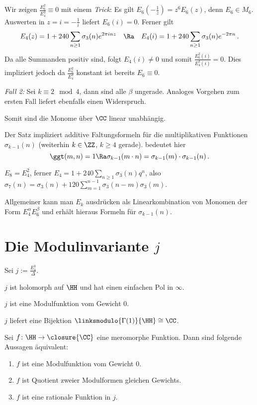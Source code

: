 \begin{bewe}
Wir zeigen $\frac{E_6^2}{E_4^3} \equiv 0$ mit einem \emph{Trick}: Es gilt $E_6 (- \frac 1z) = z^6 E_6(z)$, denn $E_6 \in M_6$. Auswerten in $z = i = - \frac 1i$ liefert $E_6 (i) = 0$. Ferner gilt
\[
E_4(z) = 1 + 240 \sum_{n \geq 1} \sigma_3 (n) e^{2\pi i n z} \quad \Ra \quad E_4 (i) = 1 + 240 \sum_{n \geq 1} \sigma_3 (n) e^{-2 \pi n}
\,.
\] 
Da alle Summanden positiv sind, folgt $E_4(i) \neq 0$ und somit $\frac{E_6^2(i)}{E_4^3(i)} = 0$. Dies impliziert jedoch da $\frac{E_6^2}{E_4^3}$ konstant ist bereits $E_6 \equiv 0$. \blitz

\emph{Fall 2:} Sei $k \equiv 2 \mod 4$, dann sind alle $\beta$ ungerade. Analoges Vorgehen zum ersten Fall liefert ebenfalls einen Widerspruch.

Somit sind die Monome über $\CC$ linear unabhängig.
\end{bewe}

\begin{beme}
Der Satz impliziert additive Faltungsformeln für die multiplikativen Funktionen $\sigma_{k-1} (n)$ (weiterhin $k \in \ZZ$, $k \geq 4$ gerade).  bedeutet hier
\[
\ggt (m,n) = 1 \Ra \sigma_{k-1}(m \cdot n) = \sigma_{k-1}(m)\cdot \sigma_{k-1}(n)
\,.
\]
\end{beme}

\begin{bsp}
$E_8 = E_4^2$, ferner $E_4 = 1 + 240 \sum_{n \geq 1} \sigma_3(n) q^n$, also $\sigma_7 (n) = \sigma_3 (n) + 120 \sum_{m=1}^{n-1} \sigma_3 (n-m) \sigma_3 (m)$.

Allgemeiner kann man $E_k$ ausdrücken als Linearkombination von Monomen der Form $E_4^\alpha E_6^\beta$ und erhält hieraus Formeln für $\sigma_{k-1}(n)$.
\end{bsp}

\section{Die Modulinvariante $j$}

\begin{defi}
Sei $j := \frac{E_4^3}{\Delta}$.
\end{defi}

\begin{satz-list}
\item $j$ ist holomorph auf $\HH$ und hat einen einfachen Pol in $\infty$.
\item $j$ ist eine Modulfunktion vom Gewicht $0$.
\item $j$ liefert eine Bijektion $\linksmodulo{\Gamma(1)}{\HH} \cong \CC$.
\end{satz-list}

\begin{satz}
Sei $f\colon \HH \to \closure{\CC}$ eine meromorphe Funktion. Dann sind folgende Aussagen äquivalent:
\begin{enumerate}
\item $f$ ist eine Modulfunktion vom Gewicht 0.
\item $f$ ist Quotient zweier Modulformen gleichen Gewichts.
\item $f$ ist eine rationale Funktion in $j$.
\end{enumerate}
\end{satz}

